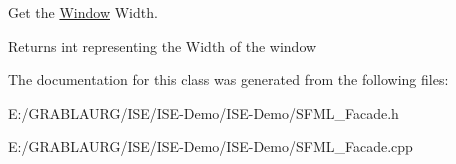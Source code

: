 Get the \hyperlink{class_window}{Window} Width. 

\begin{DoxyReturn}{Returns}
int representing the Width of the window 
\end{DoxyReturn}


The documentation for this class was generated from the following files\-:\begin{DoxyCompactItemize}
\item 
E\-:/\-G\-R\-A\-B\-L\-A\-U\-R\-G/\-I\-S\-E/\-I\-S\-E-\/\-Demo/\-I\-S\-E-\/\-Demo/S\-F\-M\-L\-\_\-\-Facade.\-h\item 
E\-:/\-G\-R\-A\-B\-L\-A\-U\-R\-G/\-I\-S\-E/\-I\-S\-E-\/\-Demo/\-I\-S\-E-\/\-Demo/S\-F\-M\-L\-\_\-\-Facade.\-cpp\end{DoxyCompactItemize}
